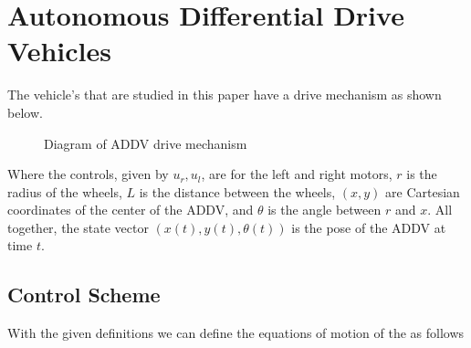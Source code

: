 \documentclass[journal]{IEEEtran}
\begin{document}
\section{Autonomous Differential Drive Vehicles}
The vehicle's that are studied in this paper have a drive mechanism as shown below. 

\def\Dimline[#1][#2][#3][#4]{
    \begin{scope}[>=latex] %
        \draw let \p1=#1, \p2=#2, \n0={veclen(\x2-\x1,\y2-\y1)} in [|<->|,
        decoration={markings, %
                mark=at position .5 with {\node[#3] at (0,0) {#4};},
        },
        postaction=decorate] #1 -- #2 ;
    \end{scope}
}

\begin{figure}[h]
    \centering
    \caption{Diagram of ADDV drive mechanism}
    \label{fig:addv_drive}
\end{figure}
Where the controls, given by $u_r, u_l$, are for the left and right motors, $r$ is the radius of the wheels,
$L$ is the distance between the wheels, $(x,y)$ are Cartesian coordinates of the center of the ADDV, 
and $\theta$ is the angle between $r$ and $x$. All together, the state vector $(x(t), y(t), \theta(t))$
is the pose of the ADDV at time $t$.

\subsection{Control Scheme}
With the given definitions we can define the equations of motion of the as follows
\end{document}
